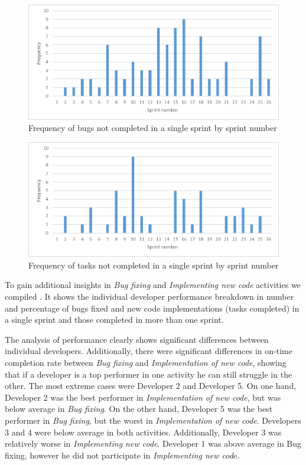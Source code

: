 \begin{figure}
	\centering
	\includegraphics[width=\linewidth]{figures/frequency-of-bugs}
	\caption{Frequency of bugs not completed in a single sprint by sprint number}
	\label{fig:frequency-of-bugs}
\end{figure}

\begin{figure}
	\centering
	\includegraphics[width=\linewidth]{figures/frequency-of-tasks}
	\caption{Frequency of tasks not completed in a single sprint by sprint number}
	\label{fig:frequency-of-tasks}
\end{figure}


To gain additional insights in \emph{Bug fixing} and \emph{Implementing new code} activities we compiled . It shows the individual developer performance breakdown in number and percentage of bugs fixed and new code implementations (tasks completed) in a single sprint and those completed in more than one sprint. 



The analysis of performance clearly shows significant differences between individual developers. Additionally, there were significant differences in on-time completion rate between \emph{Bug fixing} and\emph{ Implementation of new code}, showing that if a developer is a top performer in one activity he can still struggle in the other. The most extreme cases were Developer 2 and Developer 5. On one hand, Developer 2 was the best performer in \emph{Implementation of new code}, but was below average in \emph{Bug fixing}. On the other hand, Developer 5 was the best performer in \emph{Bug fixing}, but the worst in \emph{Implementation of new code}. Developers 3 and 4 were below average in both activities. Additionally, Developer 3 was relatively worse in \emph{Implementing new code}. Developer 1 was above average in Bug fixing, however he did not participate in \emph{Implementing new cod}e.

